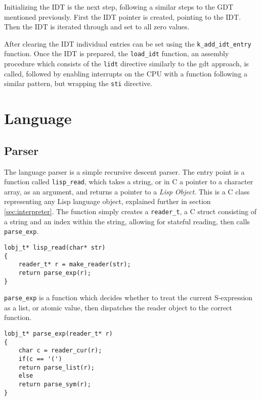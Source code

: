 \documentclass[10pt]{report}
\begin{document}


Initializing the IDT is the next step, following a similar steps to the GDT mentioned previously. First the IDT pointer is created, pointing to the IDT. Then the IDT is iterated through and set to all zero values. 



After clearing the IDT individual entries can be set using the \texttt{k_add_idt_entry} function. Once the IDT is prepared, the \texttt{load_idt} function, an assembly procedure which consists of the \texttt{lidt} directive similarly to the gdt approach, is called, followed by enabling interrupts on the CPU with a function following a similar pattern, but wrapping the \texttt{sti} directive.



\section{Language}
\subsection{Parser}
The language parser is a simple recursive descent parser. The entry point is a function called \texttt{lisp_read}, which takes a string, or in C a pointer to a character array, as an argument, and returns a pointer to a \textit{Lisp Object}. This is a C class representing any Lisp language object, explained further in section \ref{sec:interpreter}. The function simply creates a \texttt{reader_t}, a C struct consisting of a string and an index within the string, allowing for stateful reading, then calls \texttt{parse_exp}.

\begin{lstlisting}
lobj_t* lisp_read(char* str)
{	
    reader_t* r = make_reader(str);
    return parse_exp(r);
}
\end{lstlisting}

\texttt{parse_exp} is a function which decides whether to treat the current S-expression as a list, or atomic value, then dispatches the reader object to the correct function.

\begin{lstlisting}
lobj_t* parse_exp(reader_t* r)
{
    char c = reader_cur(r);    
    if(c == '(')
	return parse_list(r);
    else
	return parse_sym(r);
}
\end{lstlisting}
\end{document}
